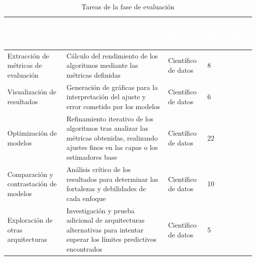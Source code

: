 \begin{table}[htp]
	\centering
	\begin{tabular}{ | m{4cm} | m{6cm} | m{2cm} | m{2cm} | }
		\hline
		\rowcolor[HTML]{5B9BD5} 
		\textcolor{white}{\textbf{Tarea}} & \textcolor{white}{\textbf{Descripción}} & \textcolor{white}{\textbf{Rol}} & \textcolor{white}{\textbf{Duración Estimada (horas)}} \\
		\hline
		
		Extracción de métricas de evaluación & Cálculo del rendimiento de los algoritmos mediante las métricas definidas & Científico de datos & 8 \\
		\hline
		Visualización de resultados & Generación de gráficas para la interpretación del ajuste y error cometido por los modelos & Científico de datos & 6 \\
		\hline
		Optimización de modelos & Refinamiento iterativo de los algoritmos tras analizar las métricas obtenidas, realizando ajustes finos en las capas o los estimadores base & Científico de datos & 22 \\
		\hline
		Comparación y contrastación de modelos & Análisis crítico de los resultados para determinar las fortalezas y debilidades de cada enfoque & Científico de datos & 10 \\
		\hline
		Exploración de otras arquitecturas & Investigación y prueba adicional de arquitecturas alternativas para intentar superar los límites predictivos encontrados & Científico de datos & 5 \\
		\hline
		
	\end{tabular} 
	
	\caption{Tareas de la fase de evaluación}
\end{table}